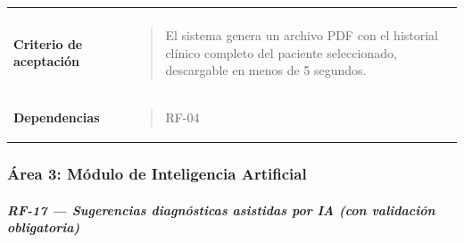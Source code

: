 \documentclass[
]{article}
\begin{document}
{\begin{longtable}[]{@{}
  >{\raggedright\arraybackslash}p{}
  >{\raggedright\arraybackslash}p{}@{}}
\begin{minipage}[t]{\linewidth}
\end{minipage} \\
\textbf{Criterio de aceptación} &
\begin{minipage}[t]{\linewidth}\raggedright
\begin{quote}
El sistema genera un archivo PDF con el historial clínico completo del
paciente seleccionado, descargable en menos de 5 segundos.
\end{quote}
\end{minipage} \\
\textbf{Dependencias} & \begin{minipage}[t]{\linewidth}\raggedright
\begin{quote}
RF-04
\end{quote}
\end{minipage} \\
\end{longtable}
}

\subsubsection{Área 3: Módulo de Inteligencia
Artificial}\label{uxe1rea-3-muxf3dulo-de-inteligencia-artificial}

\subparagraph{RF-17 --- Sugerencias diagnósticas asistidas por IA (con
validación
obligatoria)}\label{rf-17-sugerencias-diagnuxf3sticas-asistidas-por-ia-con-validaciuxf3n-obligatoria}
\end{document}
